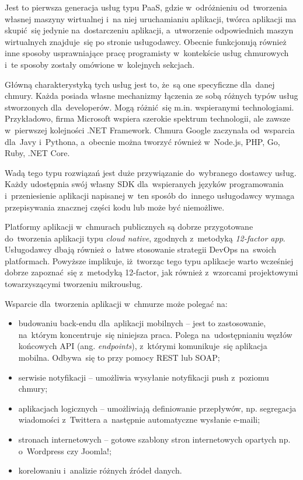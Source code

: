 \documentclass[12pt,a4paper,twoside,titlepage,openright]{book}
\begin{document}
Jest to pierwsza generacja usług typu PaaS, gdzie w~odróżnieniu od~tworzenia własnej maszyny wirtualnej i~na niej uruchamianiu aplikacji, twórca aplikacji ma skupić~się jedynie na~dostarczeniu aplikacji, a~utworzenie odpowiednich maszyn wirtualnych znajduje~się po stronie usługodawcy. Obecnie funkcjonują również inne sposoby usprawniające pracę programisty w~kontekście usług chmurowych i~te sposoby zostały omówione w~kolejnych sekcjach.

Główną charakterystyką tych usług jest to, że~są one specyficzne dla~danej chmury. Każda posiada własne mechanizmy łączenia ze sobą różnych typów usług stworzonych dla~developerów. Mogą różnić~się m.in. wspieranymi technologiami. Przykładowo, firma Microsoft wspiera szerokie spektrum technologii, ale zawsze w~pierwszej kolejności .NET Framework. Chmura Google zaczynała od~wsparcia dla~Javy i~Pythona, a~obecnie można tworzyć również w~Node.js, PHP, Go, Ruby, .NET Core.

Wadą tego typu rozwiązań jest duże przywiązanie do~wybranego dostawcy usług. Każdy udostępnia swój własny SDK dla~wspieranych języków programowania i~przeniesienie aplikacji napisanej w~ten sposób do~innego usługodawcy wymaga przepisywania znacznej części kodu lub może być niemożliwe.

Platformy aplikacji w~chmurach publicznych są dobrze przygotowane do~tworzenia aplikacji typu \textit{cloud native}, zgodnych z~metodyką \textit{12-factor app}. Usługodawcy dbają również o~łatwe stosowanie strategii DevOps na~swoich platformach. Powyższe implikuje, iż~tworząc tego typu aplikacje warto wcześniej dobrze zapoznać~się z~metodyką 12-factor, jak również z~wzorcami projektowymi towarzyszącymi tworzeniu mikrousług. 

Wsparcie dla~tworzenia aplikacji w~chmurze może polegać na:
\begin{itemize}
\item budowaniu back-endu dla~aplikacji mobilnych -- jest to zastosowanie, na~którym koncentruje~się niniejsza praca. Polega na~udostępnianiu węzłów końcowych API (ang. \textit{endpoints}), z~którymi komunikuje~się aplikacja mobilna. Odbywa~się to przy pomocy REST lub SOAP;
\item serwisie notyfikacji -- umożliwia wysyłanie notyfikacji push z~poziomu chmury;
\item aplikacjach logicznych -- umożliwiają definiowanie przepływów, np. segregacja wiadomości z~Twittera a~następnie automatyczne wysłanie e-maili;
\item stronach internetowych -- gotowe szablony stron internetowych opartych np. o~Wordpress czy Joomla!;
\item korelowaniu i~analizie różnych źródeł danych.
\end{itemize}
\end{document}
